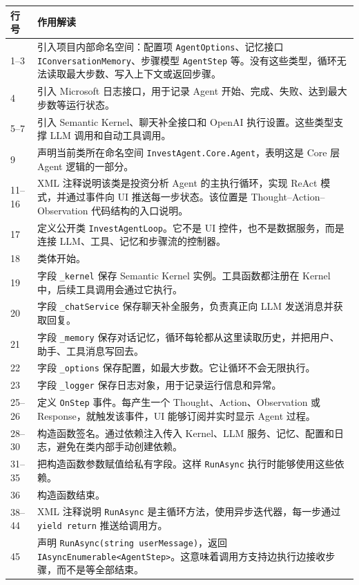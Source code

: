 \documentclass[UTF8,a4paper,11pt]{ctexart}
\begin{document}
\begin{longtable}{p{2.4cm}p{12.6cm}}
\toprule
行号 & 作用解读\\
\midrule
\endhead
1--3 & 引入项目内部命名空间：配置项 \texttt{AgentOptions}、记忆接口 \texttt{IConversationMemory}、步骤模型 \texttt{AgentStep} 等。没有这些类型，循环无法读取最大步数、写入上下文或返回步骤。\\
4 & 引入 Microsoft 日志接口，用于记录 Agent 开始、完成、失败、达到最大步数等运行状态。\\
5--7 & 引入 Semantic Kernel、聊天补全接口和 OpenAI 执行设置。这些类型支撑 LLM 调用和自动工具调用。\\
9 & 声明当前类所在命名空间 \texttt{InvestAgent.Core.Agent}，表明这是 Core 层 Agent 逻辑的一部分。\\
11--16 & XML 注释说明该类是投资分析 Agent 的主执行循环，实现 ReAct 模式，并通过事件向 UI 推送每一步状态。该位置是 Thought--Action--Observation 代码结构的入口说明。\\
17 & 定义公开类 \texttt{InvestAgentLoop}。它不是 UI 控件，也不是数据服务，而是连接 LLM、工具、记忆和步骤流的控制器。\\
18 & 类体开始。\\
19 & 字段 \texttt{\_kernel} 保存 Semantic Kernel 实例。工具函数都注册在 Kernel 中，后续工具调用会通过它执行。\\
20 & 字段 \texttt{\_chatService} 保存聊天补全服务，负责真正向 LLM 发送消息并获取回复。\\
21 & 字段 \texttt{\_memory} 保存对话记忆，循环每轮都从这里读取历史，并把用户、助手、工具消息写回去。\\
22 & 字段 \texttt{\_options} 保存配置，如最大步数。它让循环不会无限执行。\\
23 & 字段 \texttt{\_logger} 保存日志对象，用于记录运行信息和异常。\\
25--26 & 定义 \texttt{OnStep} 事件。每产生一个 Thought、Action、Observation 或 Response，就触发该事件，UI 能够订阅并实时显示 Agent 过程。\\
28--30 & 构造函数签名。通过依赖注入传入 Kernel、LLM 服务、记忆、配置和日志，避免在类内部手动创建依赖。\\
31--35 & 把构造函数参数赋值给私有字段。这样 \texttt{RunAsync} 执行时能够使用这些依赖。\\
36 & 构造函数结束。\\
38--44 & XML 注释说明 \texttt{RunAsync} 是主循环方法，使用异步迭代器，每一步通过 \texttt{yield return} 推送给调用方。\\
45 & 声明 \texttt{RunAsync(string userMessage)}，返回 \texttt{IAsyncEnumerable<AgentStep>}。这意味着调用方支持边执行边接收步骤，而不是等全部结束。\\

\end{longtable}
\end{document}
